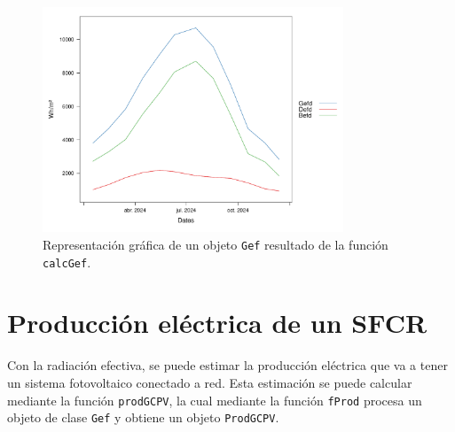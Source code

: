 \begin{figure}[!htb]
\centering
\includegraphics[width=0.8\textwidth]{figuras/codigo-gef.pdf}
\caption{Representación gráfica de un objeto \texttt{Gef} resultado de la función \texttt{calcGef}.}
\end{figure}
\FloatBarrier
\section{Producción eléctrica de un SFCR}
\label{sec:org50312d5}
\label{produccion-electrica-sfcr}
Con la radiación efectiva, se puede estimar la producción eléctrica que va a tener un sistema fotovoltaico conectado a red. Esta estimación se puede calcular mediante la función \texttt{prodGCPV}, la cual mediante la función \texttt{fProd} procesa un objeto de clase \texttt{Gef} y obtiene un objeto \texttt{ProdGCPV}.


